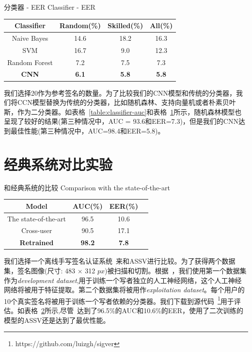 \begin{table}[ht]
  \centering
    \bicaption
    {分类器 - EER}
    {Classifier - EER}
    \label{table:classifier-eer}
    \begin{tabular}{c c c c}
      \hline\hline 
      Classifier & Random(\%) & Skilled(\%) & All(\%) \\ 
      \hline 
      Naive Bayes & 14.6 & 18.2 & 16.3 \\
      SVM & 16.7 & 9.0 & 12.3 \\
      Random Forest & 7.2 & 7.5 & 7.3 \\
       \textbf{CNN} &  \textbf{6.1} &  \textbf{5.8} &  \textbf{5.8} \\
      \hline 
    \end{tabular}
\end{table}
我们选择20作为参考签名的数量。为了比较我们的CNN模型和传统的分类器，我们将CCN模型替换为传统的分类器，比如随机森林、支持向量机或者朴素贝叶斯，作为二分类器。如表格~\ref{table:classifier-auc}和表格~\ref{table:classifier-eer}所示，随机森林模型也呈现了较好的结果(第三种情况中，AUC = 93.6和EER=7.3)，但是我们的CNN达到最佳性能(第三种情况中，AUC=98.4和EER=5.8)。

\section{经典系统对比实验}
\begin{table}[ht]
  \centering
    \bicaption
    {和经典系统的比较}
    {Comparison with the state-of-the-art}
    \label{table:the-state-the-art} 
    \begin{tabular}{c c c c} 
      \hline\hline 
      Model & AUC(\%) & EER(\%) \\ 
      \hline 
      The state-of-the-art & 96.5 & 10.6\\
      Cross-user & 90.5 & 17.1 \\
      \textbf{Retrained} & \textbf{98.2} & \textbf{7.8}\\
      \hline 
    \end{tabular}
\end{table}

我们选择一个离线手写签名认证系统~\cite{hafemann2017learning}来和ASSV进行比较。为了获得两个数据集，签名图像(尺寸: 483 $\times$ 312 $px$)被扫描和切割。根据~\cite{hafemann2017learning}，我们使用第一个数据集作为\textit{development dataset},用于训练一个写者独立的人工神经网络，这个人工神经网络将被用于特征提取。第二个数据集将被用作\textit{exploitation dataset}。每个用户的10个真实签名将被用于训练一个写者依赖的分类器。我们下载到源代码~\footnote{https://github.com/luizgh/sigver}用于评估。如表格~\ref{table:the-state-the-art}所示,尽管~\cite{hafemann2017learning}达到了96.5\%的AUC和10.6\%的EER，使用了二次训练的模型的ASSV还是达到了最优性能。

